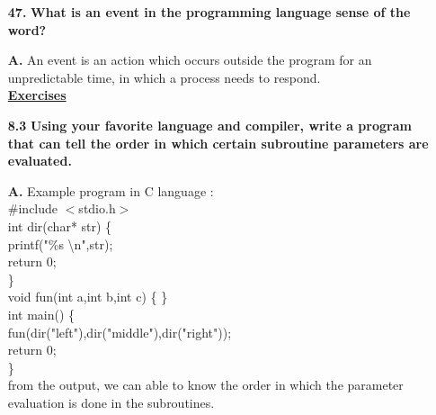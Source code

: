 \documentclass[letterpaper]{article}
\begin{document}
\begin{large}
\begin{flushleft}
\begin{enumerate}
\item[\textbf{47.}]
\textbf{What is an event in the programming language sense of the word?}
\item[\textbf{A.}]
An event is an action which occurs outside the program for an unpredictable time, in which a process needs to respond.\\[0.2in]
 
\textbf{\underline{Exercises }}\\[0.2in]

\item[\textbf{8.3}]
\textbf{Using your favorite language and compiler, write a program that can tell the order in which certain subroutine parameters are evaluated.}
\item[\textbf{A.}]
Example program in C language : \\
\#include $<$stdio.h$>$ \\
int dir(char* str) \{\\
printf("\%s \textbackslash n",str);\\
return 0;\\
\}\\
void fun(int a,int b,int c) \{ \} \\
int main() \{ \\
fun(dir("left"),dir("middle"),dir("right")); \\
return 0; \\
\} \\
from the output, we can able to know the order in which the parameter evaluation is done in the subroutines. 


\end{enumerate}
\end{flushleft}
\end{large}
\end{document}
